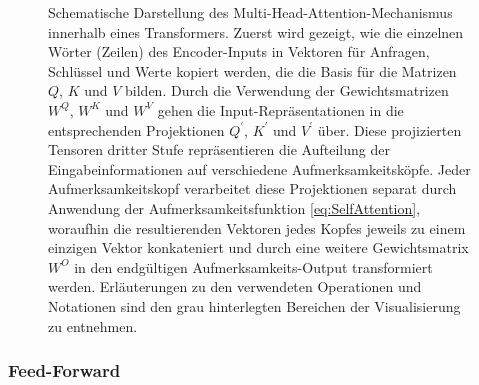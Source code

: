 \begin{landscape}
\begin{figure}
	\centering
	
	\caption{Schematische Darstellung des Multi-Head-Attention-Mechanismus innerhalb eines Transformers. Zuerst wird gezeigt, wie die einzelnen Wörter (Zeilen) des Encoder-Inputs in Vektoren für Anfragen, Schlüssel und Werte kopiert werden, die die Basis für die Matrizen $Q$, $K$ und $V$ bilden. Durch die Verwendung der Gewichtsmatrizen $W^Q$, $W^K$ und $W^V$ gehen die Input-Repräsentationen in die entsprechenden Projektionen $Q^\prime$, $K^\prime$ und $V^\prime$ über. Diese projizierten Tensoren dritter Stufe repräsentieren die Aufteilung der Eingabeinformationen auf verschiedene Aufmerksamkeitsköpfe. Jeder Aufmerksamkeitskopf verarbeitet diese Projektionen separat durch Anwendung der Aufmerksamkeitsfunktion \ref{eq:SelfAttention}, woraufhin die resultierenden Vektoren jedes Kopfes jeweils zu einem einzigen Vektor konkateniert und durch eine weitere Gewichtsmatrix $W^O$ in den endgültigen Aufmerksamkeits-Output transformiert werden. Erläuterungen zu den verwendeten Operationen und Notationen sind den grau hinterlegten Bereichen der Visualisierung zu entnehmen.}
	\label{Abb:MultiheadAttention}
\end{figure}
\end{landscape}



\subsubsection*{Feed-Forward}

